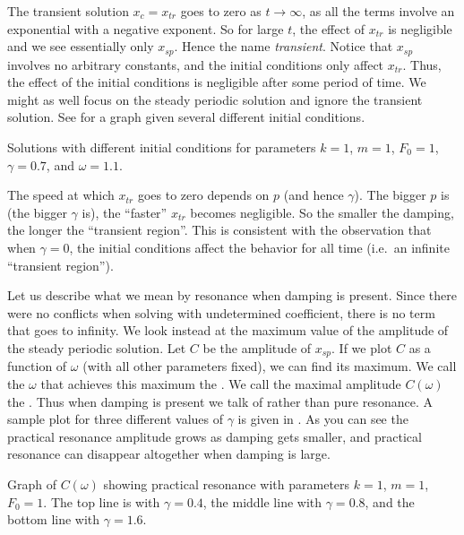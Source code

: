 \documentclass{ximera}
\begin{document}
The transient solution $x_c = x_{tr}$ goes to zero as $t \to \infty$, as all the terms involve an exponential with a negative exponent.  So for large $t$, the effect of $x_{tr}$ is negligible and we see essentially only $x_{sp}$. Hence the name \emph{transient}. Notice that $x_{sp}$ involves no arbitrary constants, and the initial conditions only affect $x_{tr}$.  Thus, the effect of the initial conditions is negligible after some period of time. %
We might as well focus on the steady periodic solution and ignore the transient solution.  See  for a graph given several different initial conditions. 

\begin{mywrapfig}{3.25in}
    \capstart
    \caption{Solutions with different initial conditions for parameters $k=1$, $m=1$, $F_0 = 1$, $\gamma=0.7$, and $\omega=1.1$.\label{3.6:transbehfig}}
\end{mywrapfig}

The speed at which $x_{tr}$ goes to zero depends on $p$ (and hence $\gamma$).  The bigger $p$ is (the bigger $\gamma$ is), the ``faster'' $x_{tr}$ becomes negligible.  So the smaller the damping, the longer the ``transient region''. This is consistent with the observation that when $\gamma=0$, the initial conditions affect the behavior for all time (i.e.\ an infinite ``transient region'').

\medskip

Let us describe what we mean by resonance when damping is present. Since there were no conflicts when solving with undetermined coefficient, there is no term that goes to infinity.  We look instead at the maximum value of the amplitude of the steady periodic solution. Let $C$ be the amplitude of $x_{sp}$. If we plot $C$ as a function of $\omega$ (with all other parameters fixed), we can find its maximum. We call the $\omega$ that achieves this maximum the \emph{}. We call the maximal amplitude $C(\omega)$ the \emph{}. Thus when damping is present we talk of \emph{} rather than pure resonance. A sample plot for three different values of $\gamma$ is given in .  As you can see the practical resonance amplitude grows as damping gets smaller, and practical resonance can disappear altogether when damping is large.

\begin{myfig}
    \capstart
    \caption{Graph of $C(\omega)$ showing practical resonance with parameters $k=1$, $m=1$, $F_0 = 1$. The top line is with $\gamma=0.4$, the middle line with $\gamma=0.8$, and the bottom line with $\gamma=1.6$.\label{3.6:pracresfig}}
\end{myfig}
\end{document}
